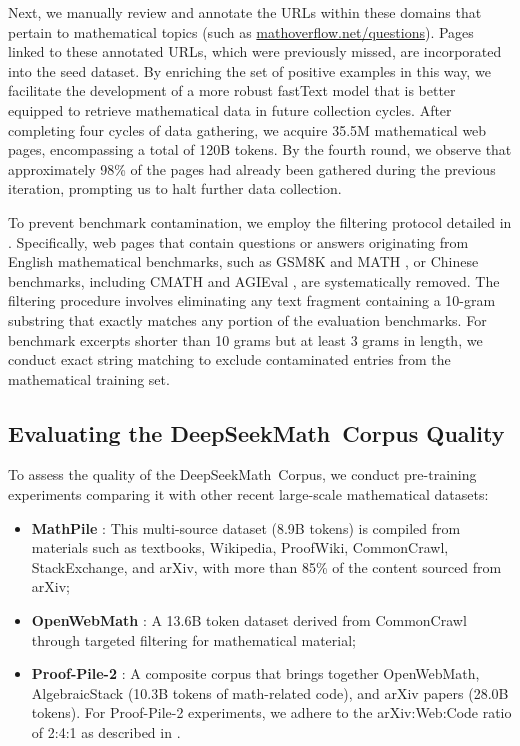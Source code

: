 Next, we manually review and annotate the URLs within these domains that pertain to mathematical topics (such as \url{mathoverflow.net/questions}). Pages linked to these annotated URLs, which were previously missed, are incorporated into the seed dataset. By enriching the set of positive examples in this way, we facilitate the development of a more robust fastText model that is better equipped to retrieve mathematical data in future collection cycles. After completing four cycles of data gathering, we acquire 35.5M mathematical web pages, encompassing a total of 120B tokens. By the fourth round, we observe that approximately 98\% of the pages had already been gathered during the previous iteration, prompting us to halt further data collection.

To prevent benchmark contamination, we employ the filtering protocol detailed in \cite{deepseek-coder}. Specifically, web pages that contain questions or answers originating from English mathematical benchmarks, such as GSM8K \citep{gsm8k} and MATH \citep{MATH}, or Chinese benchmarks, including CMATH \citep{wei2023cmath} and AGIEval \citep{agieval}, are systematically removed. The filtering procedure involves eliminating any text fragment containing a 10-gram substring that exactly matches any portion of the evaluation benchmarks. For benchmark excerpts shorter than 10 grams but at least 3 grams in length, we conduct exact string matching to exclude contaminated entries from the mathematical training set.

\subsection{Evaluating the DeepSeekMath~Corpus Quality}

To assess the quality of the DeepSeekMath~Corpus, we conduct pre-training experiments comparing it with other recent large-scale mathematical datasets:

\begin{itemize}[topsep=0pt]
    \item \textbf{MathPile} \citep{mathpile}: This multi-source dataset (8.9B tokens) is compiled from materials such as textbooks, Wikipedia, ProofWiki, CommonCrawl, StackExchange, and arXiv, with more than 85\% of the content sourced from arXiv;
    \item \textbf{OpenWebMath} \citep{openwebmath}: A 13.6B token dataset derived from CommonCrawl through targeted filtering for mathematical material;
    \item \textbf{Proof-Pile-2} \citep{llemma}: A composite corpus that brings together OpenWebMath, AlgebraicStack (10.3B tokens of math-related code), and arXiv papers (28.0B tokens). For Proof-Pile-2 experiments, we adhere to the arXiv:Web:Code ratio of 2:4:1 as described in \cite{llemma}.
\end{itemize}

